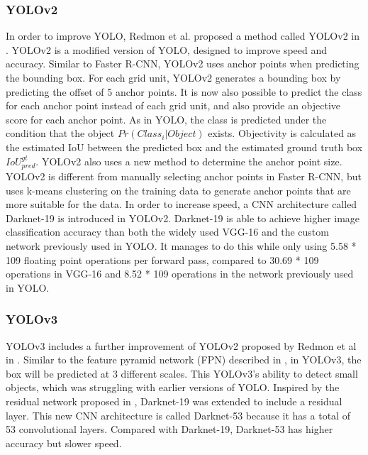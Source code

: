 \subsubsection{YOLOv2}
In order to improve YOLO, Redmon et al. proposed a method called YOLOv2 in \cite{DBLP:journals/corr/RedmonF16}. YOLOv2 is a modified version of YOLO, designed to improve speed and accuracy.
Similar to Faster R-CNN, YOLOv2 uses anchor points when predicting the bounding box. For each grid unit, YOLOv2 generates a bounding box by predicting the offset of 5 anchor points. It is now also possible to predict the class for each anchor point instead of each grid unit, and also provide an objective score for each anchor point. As in YOLO, the class is predicted under the condition that the object \(Pr(Class_i|Object)\) exists. Objectivity is calculated as the estimated IoU between the predicted box and the estimated ground truth box \(IoU_{pred}^{gt}\). YOLOv2 also uses a new method to determine the anchor point size. YOLOv2 is different from manually selecting anchor points in Faster R-CNN, but uses k-means clustering on the training data to generate anchor points that are more suitable for the data.
In order to increase speed, a CNN architecture called Darknet-19 is introduced in YOLOv2. Darknet-19 is able to achieve higher image classification accuracy than both the widely used VGG-16 and the custom network previously used in YOLO. It manages to do this while only using 5.58 * 109 floating point operations per forward pass, compared to 30.69 * 109 operations in VGG-16 and 8.52 * 109 operations in the network previously used in YOLO.
\subsubsection{YOLOv3}
YOLOv3 includes a further improvement of YOLOv2 proposed by Redmon et al in \cite{DBLP:journals/corr/abs-1804-02767}. Similar to the feature pyramid network (FPN) described in \cite{DBLP:journals/corr/LinDGHHB16}, in YOLOv3, the box will be predicted at 3 different scales. This YOLOv3's ability to detect small objects, which was struggling with earlier versions of YOLO.
Inspired by the residual network proposed in \cite{DBLP:journals/corr/HeZRS15}, Darknet-19 was extended to include a residual layer. This new CNN architecture is called Darknet-53 because it has a total of 53 convolutional layers. Compared with Darknet-19, Darknet-53 has higher accuracy but slower speed.
